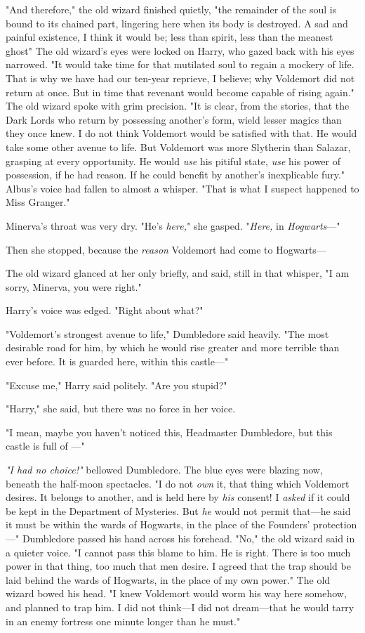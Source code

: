 "And therefore," the old wizard finished quietly, "the remainder of the soul is
bound to its chained part, lingering here when its body is destroyed. A sad and
painful existence, I think it would be; less than spirit, less than the meanest
ghost{\el}" The old wizard's eyes were locked on Harry, who gazed back with
his eyes narrowed. "It would take time for that mutilated soul to regain a
mockery of life. That is why we have had our ten-year reprieve, I believe; why
Voldemort did not return at once. But in time{\el} that revenant would
become capable of rising again." The old wizard spoke with grim precision. "It
is clear, from the stories, that the Dark Lords who return by possessing
another's form, wield lesser magics than they once knew. I do not think
Voldemort would be satisfied with that. He would take some other avenue to
life. But Voldemort was more Slytherin than Salazar, grasping at every
opportunity. He would \emph{use} his pitiful state, \emph{use} his power of
possession, if he had reason. If he could benefit by another's{\el}
inexplicable fury." Albus's voice had fallen to almost a whisper. "That is what
I suspect happened to Miss Granger."

Minerva's throat was very dry. "He's \emph{here,}" she gasped. "\emph{Here,} in
\emph{Hogwarts}\mbox{---}"

Then she stopped, because the \emph{reason} Voldemort had come to Hogwarts\mbox{---}

The old wizard glanced at her only briefly, and said, still in that whisper, "I
am sorry, Minerva, you were right."

Harry's voice was edged. "Right about what?"

"Voldemort's strongest avenue to life," Dumbledore said heavily. "The most
desirable road for him, by which he would rise greater and more terrible than
ever before. It is guarded here, within this castle\mbox{---}"

"Excuse me," Harry said politely. "Are you stupid?"

"Harry," she said, but there was no force in her voice.

"I mean, maybe you haven't noticed this, Headmaster Dumbledore, but this castle
is full of \emph{}\mbox{---}"

\emph{"I had no choice!"} bellowed Dumbledore. The blue eyes were blazing now,
beneath the half-moon spectacles. "I do not \emph{own} it, that thing which
Voldemort desires. It belongs to another, and is held here by \emph{his}
consent! I \emph{asked} if it could be kept in the Department of Mysteries. But
\emph{he} would not permit that---he said it must be within the wards of
Hogwarts, in the place of the Founders' protection\mbox{---}" Dumbledore passed his
hand across his forehead. "No," the old wizard said in a quieter voice. "I
cannot pass this blame to him. He is right. There is too much power in that
thing, too much that men desire. I agreed that the trap should be laid behind
the wards of Hogwarts, in the place of my own power." The old wizard bowed his
head. "I knew Voldemort would worm his way here somehow, and planned to trap
him. I did not think---I did not dream---that he would tarry in an enemy
fortress one minute longer than he must."


